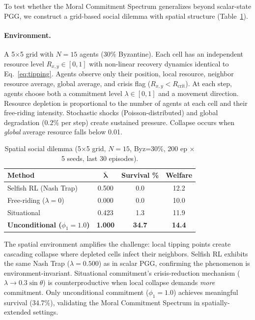 \documentclass{article}
\begin{document}
To test whether the Moral Commitment Spectrum generalizes beyond scalar-state PGG, we construct a grid-based social dilemma with spatial structure (Table~\ref{tab:spatial}).

\paragraph{Environment.}
A 5$\times$5 grid with $N{=}15$ agents (30\% Byzantine).
Each cell has an independent resource level $R_{x,y} \in [0,1]$ with non-linear recovery dynamics identical to Eq.~\ref{eq:tipping}.
Agents observe only their position, local resource, neighbor resource average, global average, and crisis flag ($R_{x,y} < R_{\text{crit}}$).
At each step, agents choose both a commitment level $\lambda \in [0,1]$ and a movement direction.
Resource depletion is proportional to the number of agents at each cell and their free-riding intensity.
Stochastic shocks (Poisson-distributed) and global degradation ($0.2\%$ per step) create sustained pressure.
Collapse occurs when \emph{global} average resource falls below 0.01.

\begin{table}[h]
\centering
\caption{Spatial social dilemma (5$\times$5 grid, $N{=}15$, Byz=30\%, 200 ep $\times$ 5 seeds, last 30 episodes).}
\label{tab:spatial}
\begin{tabular}{lccc}
\toprule
\textbf{Method} & $\boldsymbol{\bar{\lambda}}$ & \textbf{Survival \%} & \textbf{Welfare} \\
\midrule
Selfish RL (Nash Trap) & 0.500 & 0.0 & 12.2 \\
Free-riding ($\lambda{=}0$) & 0.000 & 0.0 & 10.0 \\
Situational & 0.423 & 1.3 & 11.9 \\
\textbf{Unconditional ($\phi_1{=}1.0$)} & \textbf{1.000} & \textbf{34.7} & \textbf{14.4} \\
\bottomrule
\end{tabular}
\end{table}

\noindent The spatial environment amplifies the challenge: local tipping points create cascading collapse where depleted cells infect their neighbors.
Selfish RL exhibits the same Nash Trap ($\lambda = 0.500$) as in scalar PGG, confirming the phenomenon is environment-invariant.
Situational commitment's crisis-reduction mechanism ($\lambda \to 0.3\sin\theta$) is counterproductive when local collapse demands \emph{more} commitment.
Only unconditional commitment ($\phi_1 = 1.0$) achieves meaningful survival (34.7\%), validating the Moral Commitment Spectrum in spatially-extended settings.
\end{document}
